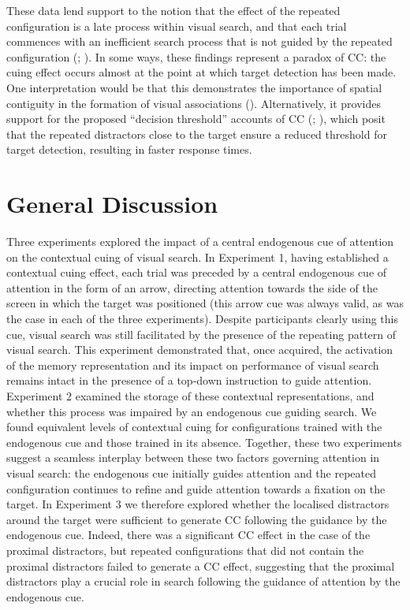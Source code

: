 \documentclass[
  man,
  floatsintext,
  longtable,
  nolmodern,
  notxfonts,
  notimes,
  colorlinks=true,linkcolor=blue,citecolor=blue,urlcolor=blue]{apa7}
\begin{document}
These data lend support to the notion that the effect of the repeated
configuration is a late process within visual search, and that each
trial commences with an inefficient search process that is not guided by
the repeated configuration (; ). In some ways, these
findings represent a paradox of CC: the cuing effect occurs almost at
the point at which target detection has been made. One interpretation
would be that this demonstrates the importance of spatial contiguity in
the formation of visual associations (). Alternatively, it provides support for the proposed
``decision threshold'' accounts of CC (; ), which posit
that the repeated distractors close to the target ensure a reduced
threshold for target detection, resulting in faster response times.

\section{General Discussion}\label{general-discussion}

Three experiments explored the impact of a central endogenous cue of
attention on the contextual cuing of visual search. In Experiment 1,
having established a contextual cuing effect, each trial was preceded by
a central endogenous cue of attention in the form of an arrow, directing
attention towards the side of the screen in which the target was
positioned (this arrow cue was always valid, as was the case in each of
the three experiments). Despite participants clearly using this cue,
visual search was still facilitated by the presence of the repeating
pattern of visual search. This experiment demonstrated that, once
acquired, the activation of the memory representation and its impact on
performance of visual search remains intact in the presence of a
top-down instruction to guide attention. Experiment 2 examined the
storage of these contextual representations, and whether this process
was impaired by an endogenous cue guiding search. We found equivalent
levels of contextual cuing for configurations trained with the
endogenous cue and those trained in its absence. Together, these two
experiments suggest a seamless interplay between these two factors
governing attention in visual search: the endogenous cue initially
guides attention and the repeated configuration continues to refine and
guide attention towards a fixation on the target. In Experiment 3 we
therefore explored whether the localised distractors around the target
were sufficient to generate CC following the guidance by the endogenous
cue. Indeed, there was a significant CC effect in the case of the
proximal distractors, but repeated configurations that did not contain
the proximal distractors failed to generate a CC effect, suggesting that
the proximal distractors play a crucial role in search following the
guidance of attention by the endogenous cue.
\end{document}
